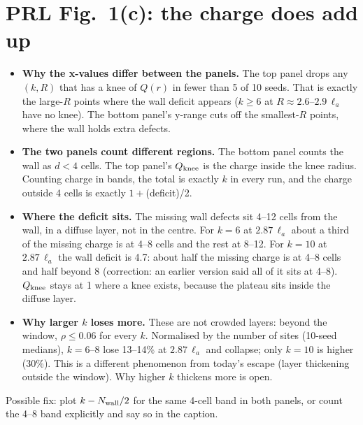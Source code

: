 \documentclass[11pt,a4paper]{article}
\newcommand{\la}{\ell_a}
\begin{document}
\section{PRL Fig.~1(c): the charge does add up}
\begin{itemize}
\item \textbf{Why the x-values differ between the panels.} The top panel drops any $(k,R)$ that has a knee of $Q(r)$ in fewer than 5 of 10 seeds. That is exactly the large-$R$ points where the wall deficit appears ($k\geq6$ at $R\approx2.6$--$2.9\,\la$ have no knee). The bottom panel's y-range cuts off the smallest-$R$ points, where the wall holds extra defects.
\item \textbf{The two panels count different regions.} The bottom panel counts the wall as $d<4$ cells. The top panel's $Q_{\rm knee}$ is the charge inside the knee radius. Counting charge in bands, the total is exactly $k$ in every run, and the charge outside 4 cells is exactly $1+{}$(deficit)/2.
\item \textbf{Where the deficit sits.} The missing wall defects sit 4--12 cells from the wall, in a diffuse layer, not in the centre. For $k=6$ at $2.87\,\la$ about a third of the missing charge is at 4--8 cells and the rest at 8--12. For $k=10$ at $2.87\,\la$ the wall deficit is 4.7: about half the missing charge is at 4--8 cells and half beyond 8 (correction: an earlier version said all of it sits at 4--8). $Q_{\rm knee}$ stays at 1 where a knee exists, because the plateau sits inside the diffuse layer.
\item \textbf{Why larger $k$ loses more.} These are not crowded layers: beyond the window, $\rho\leq0.06$ for every $k$. Normalised by the number of sites (10-seed medians), $k=6$--8 lose 13--14\% at $2.87\,\la$ and collapse; only $k=10$ is higher (30\%). This is a different phenomenon from today's escape (layer thickening outside the window). Why higher $k$ thickens more is open.
\end{itemize}
Possible fix: plot $k-N_{\rm wall}/2$ for the same 4-cell band in both panels, or count the 4--8 band explicitly and say so in the caption.
\end{document}
